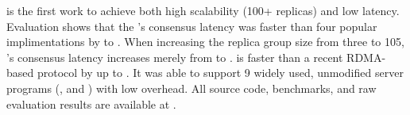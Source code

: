 \xxx is the first work to achieve both high \paxos scalability (100+ replicas) 
and low latency. Evaluation shows that the \xxx's consensus latency was faster 
than four popular \paxos implimentations by \comptradlow to \comptradhigh. When 
increasing the replica group size from three to 105, \xxx's consensus latency 
increases merely from \xxxlatencythree to \xxxlatencyonezerofive. \xxx is faster 
than a recent RDMA-based \paxos protocol by up to \fasterDARE. It was 
able to support 9 widely used, unmodified server programs (\eg, \redis and 
\mysql) with low overhead. All \xxx source code, benchmarks, and raw
evaluation results are available at \github.







